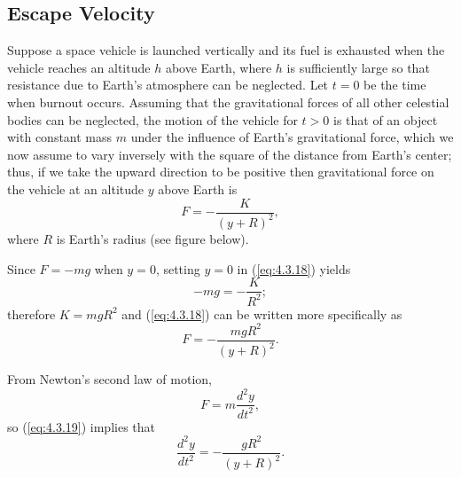 \documentclass{ximera}
\begin{document}
\begin{example}
\begin{explanation}
\begin{center}
\end{center}

\end{explanation}
\end{example}
 
\subsection*{Escape Velocity}
 
Suppose a space vehicle is launched vertically and its fuel is
exhausted when the vehicle reaches an altitude $h$ above Earth, where
$h$ is sufficiently large so that resistance due to Earth's atmosphere
can be neglected. Let $t=0$ be the time when burnout occurs.
Assuming that the gravitational forces of all other celestial bodies
can be neglected, the motion of the vehicle for $t > 0$ is that of an
object with constant mass $m$ under the influence of Earth's
gravitational force, which we now assume to vary inversely with the
square of the distance from Earth's center;  thus, if we take the
upward direction to be positive then
gravitational force on the vehicle at an altitude $y$ above Earth is
\begin{equation} \label{eq:4.3.18}
F=-\frac{K}{(y+R)^2},
\end{equation}
where $R$ is  Earth's radius (see figure below).

\begin{center}
\end{center}
 
 
 Since $F=-mg$ when $y=0$, setting $y=0$ in
(\ref{eq:4.3.18}) yields
$$
-mg=-\frac{K}{R^2};
$$
 therefore $K=mgR^2$ and (\ref{eq:4.3.18}) can be written more
specifically as
\begin{equation} \label{eq:4.3.19}
F=-\frac{mgR^2}{(y+R)^2}.
\end{equation}
 
From Newton's second law of motion,
$$
F=m\frac{d^2y}{dt^2},
$$
so (\ref{eq:4.3.19}) implies that
\begin{equation} \label{eq:4.3.20}
\frac{d^2y}{dt^2}=-\frac{gR^2}{(y+R)^2}.
\end{equation}
 
\end{document}
